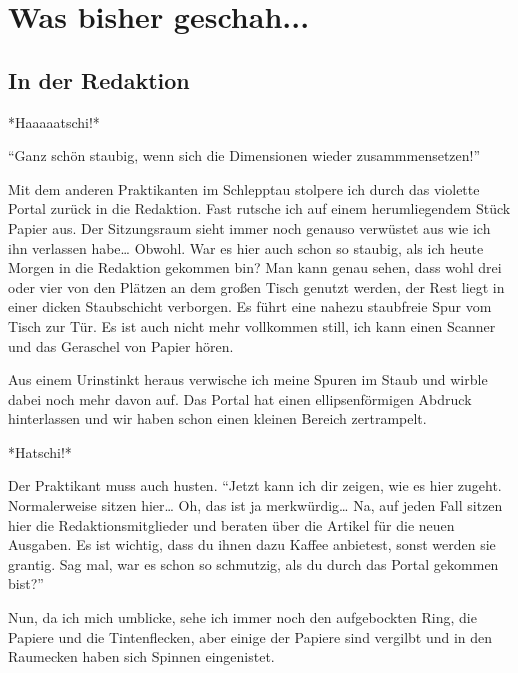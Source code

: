 \documentclass[final]{multiversum}
\begin{document}
\makemultititle
%

\section{Was bisher geschah...}


\subsection{In der Redaktion}
*Haaaaatschi!*

\enquote{Ganz schön staubig, wenn sich die Dimensionen wieder zusammmensetzen!}

Mit dem anderen Praktikanten im Schlepptau stolpere ich durch das violette Portal zurück in die Redaktion.
Fast rutsche ich auf einem herumliegendem Stück Papier aus.
Der Sitzungsraum sieht immer noch genauso verwüstet aus wie ich ihn verlassen habe\dots{} Obwohl.
War es hier auch schon so staubig, als ich heute Morgen in die Redaktion gekommen bin? 
Man kann genau sehen, dass wohl drei oder vier von den Plätzen an dem großen Tisch genutzt werden, der Rest liegt in einer dicken Staubschicht verborgen.
Es führt eine nahezu staubfreie Spur vom Tisch zur Tür.
Es ist auch nicht mehr vollkommen still, ich kann einen Scanner und das Geraschel von Papier hören.

Aus einem Urinstinkt heraus verwische ich meine Spuren im Staub und wirble dabei noch mehr davon auf. 
Das Portal hat einen ellipsenförmigen Abdruck hinterlassen und wir haben schon einen kleinen Bereich zertrampelt.

*Hatschi!*

Der Praktikant muss auch husten.
\enquote{Jetzt kann ich dir zeigen, wie es hier zugeht.
Normalerweise sitzen hier\dots{} 
Oh, das ist ja merkwürdig\dots{} 
Na, auf jeden Fall sitzen hier die Redaktionsmitglieder und beraten über die Artikel für die neuen Ausgaben.
Es ist wichtig, dass du ihnen dazu Kaffee anbietest, sonst werden sie grantig.
Sag mal, war es schon so schmutzig, als du durch das Portal gekommen bist?}

Nun, da ich mich umblicke, sehe ich immer noch den aufgebockten Ring, die Papiere und die Tintenflecken, aber einige der Papiere sind vergilbt und in den Raumecken haben sich Spinnen eingenistet.
\end{document}

